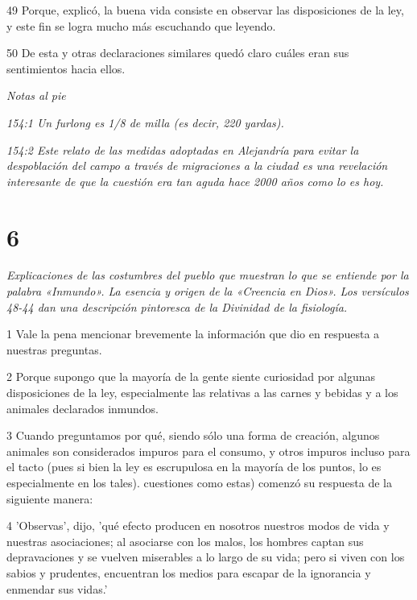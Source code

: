\par 49 Porque, explicó, la buena vida consiste en observar las disposiciones de la ley, y este fin se logra mucho más escuchando que leyendo.

\par 50 De esta y otras declaraciones similares quedó claro cuáles eran sus sentimientos hacia ellos.

\par \textit{Notas al pie}

\par \textit{154:1 Un furlong es 1/8 de milla (es decir, 220 yardas).}

\par \textit{154:2 Este relato de las medidas adoptadas en Alejandría para evitar la despoblación del campo a través de migraciones a la ciudad es una revelación interesante de que la cuestión era tan aguda hace 2000 años como lo es hoy.}

\chapter{6}

\par \textit{Explicaciones de las costumbres del pueblo que muestran lo que se entiende por la palabra «Inmundo». La esencia y origen de la «Creencia en Dios». Los versículos 48-44 dan una descripción pintoresca de la Divinidad de la fisiología.}

\par 1 Vale la pena mencionar brevemente la información que dio en respuesta a nuestras preguntas.

\par 2 Porque supongo que la mayoría de la gente siente curiosidad por algunas disposiciones de la ley, especialmente las relativas a las carnes y bebidas y a los animales declarados inmundos.

\par 3 Cuando preguntamos por qué, siendo sólo una forma de creación, algunos animales son considerados impuros para el consumo, y otros impuros incluso para el tacto (pues si bien la ley es escrupulosa en la mayoría de los puntos, lo es especialmente en los tales). cuestiones como estas) comenzó su respuesta de la siguiente manera:

\par 4 'Observas', dijo, 'qué efecto producen en nosotros nuestros modos de vida y nuestras asociaciones; al asociarse con los malos, los hombres captan sus depravaciones y se vuelven miserables a lo largo de su vida; pero si viven con los sabios y prudentes, encuentran los medios para escapar de la ignorancia y enmendar sus vidas.'

